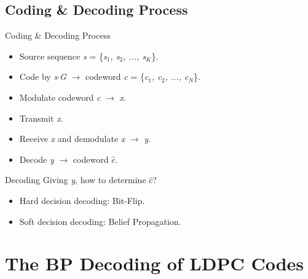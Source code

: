 \documentclass{beamer}
\newcommand{\xieti}{\textsl}
\begin{document}
\subsection{Coding \& Decoding Process}
\begin{frame}
    \begin{block}{Coding \& Decoding Process}
        \begin{itemize}
        \item Source sequence \xieti{s} = \{\xieti{s$_1$, s$_2$, ..., s$_K$}\}.
        \item Code by \xieti{s$\cdot$G} $\rightarrow$ codeword \xieti{c} = \{\xieti{c$_1$, c$_2$, ..., c$_N$}\}.
        \item Modulate codeword \xieti{c} $\rightarrow$ \xieti{x}.
        \item Transmit \xieti{x}.
        \item Receive \xieti{x} and demodulate \xieti{x} $\rightarrow$ \xieti{y}.
        \item Decode \xieti{y} $\rightarrow$ codeword \xieti{$\hat{c}$}.
        \end{itemize}
    \end{block}
\end{frame}
\begin{frame}
    \begin{block}{Decoding}
        Giving \xieti{y}, how to determine \xieti{$\hat{c}$}?
        \begin{itemize}
            \item Hard decision decoding: Bit-Flip.
            \item Soft decision decoding: Belief Propagation.
        \end{itemize}
    \end{block}
\end{frame}

\section{The BP Decoding of LDPC Codes}
\end{document}
